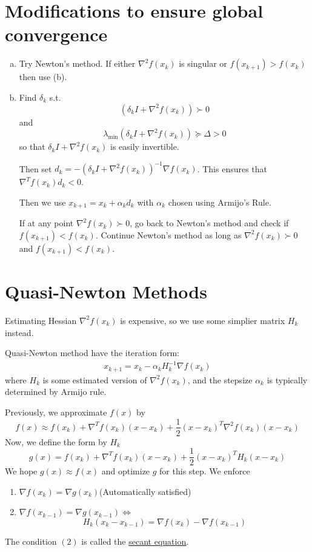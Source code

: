 \documentclass[11pt]{elegantbook}
\begin{document}
\section{Modifications to ensure global convergence}
\begin{enumerate}[(a)]
    \item Try Newton's method. If either $\nabla^2 f(x_k)$ is singular or $f(x_{k+1})>f(x_{k})$ then use (b).
    \item Find $\delta_k$ s.t. $$(\delta_k I+\nabla^2 f(x_k))\succ 0$$ and $$\lambda_{\min}(\delta_k I+\nabla^2 f(x_k))\succeq \Delta >0$$ so that $\delta_k I+\nabla^2 f(x_k)$ is easily invertible.
    
    Then set $d_k=-(\delta_k I+\nabla^2 f(x_k))^{-1}\nabla f(x_k)$. This ensures that $\nabla^T f(x_k)d_k<0$.

    Then we use $x_{k+1}=x_k+\alpha_k d_k$ with $\alpha_k$ chosen using Armijo's Rule.

    If at any point $\nabla^2 f(x_k)\succ 0$, go back to Newton's method and check if $f(x_{k+1})<f(x_k)$. Continue Newton's method as long as $\nabla^2 f(x_k)\succ 0$ and $f(x_{k+1})<f(x_{k})$.
\end{enumerate}

\section{Quasi-Newton Methods}
Estimating Hessian $\nabla^2 f(x_k)$ is expensive, so we use some simplier matrix $H_k$ instead.

Quasi-Newton method have the iteration form:
\begin{equation}
    \begin{aligned}
        x_{k+1}=x_k-\alpha_kH_k^{-1}\nabla f(x_k)
    \end{aligned}
    \nonumber
\end{equation}
where $H_k$ is some estimated version of $\nabla^2 f(x_k)$, and the stepsize $\alpha_k$ is typically determined by Armijo rule.

Previously, we approximate $f(x)$ by
$$f(x)\approx f(x_k)+\nabla^T f(x_k)(x-x_k)+\frac{1}{2}(x-x_k)^T \nabla^2 f(x_k) (x-x_k)$$
Now, we define the form by $H_k$
$$g(x)=f(x_k)+\nabla^T f(x_k)(x-x_k)+\frac{1}{2}(x-x_k)^T H_k (x-x_k)$$
We hope $g(x)\approx f(x)$ and optimize $g$ for this step. We enforce
\begin{enumerate}[(1)]
    \item $\nabla f(x_k)=\nabla g(x_k)$\quad  (Automatically satisfied)
    \item $\nabla f(x_{k-1})=\nabla g(x_{k-1})$\quad $\Leftrightarrow$\quad $$H_k(x_k-x_{k-1})=\nabla f(x_k)-\nabla f(x_{k-1})$$
\end{enumerate}
The condition $(2)$ is called the \underline{secant equation}.
\end{document}
